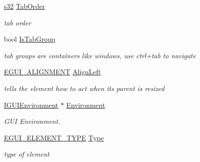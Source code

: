 \begin{DoxyCompactItemize}
\mbox{\label{classirr_1_1gui_1_1IGUIElement_a90fcd9d502bb0f6e8e5f2d091f54bafb}} 
\hyperlink{namespaceirr_ac66849b7a6ed16e30ebede579f9b47c6}{s32} \hyperlink{classirr_1_1gui_1_1IGUIElement_a90fcd9d502bb0f6e8e5f2d091f54bafb}{Tab\+Order}
\begin{DoxyCompactList}\small\item\em tab order \end{DoxyCompactList}\item 
\mbox{\label{classirr_1_1gui_1_1IGUIElement_a8ea1b4a60653c8cc157e806e14ae0558}} 
bool \hyperlink{classirr_1_1gui_1_1IGUIElement_a8ea1b4a60653c8cc157e806e14ae0558}{Is\+Tab\+Group}
\begin{DoxyCompactList}\small\item\em tab groups are containers like windows, use ctrl+tab to navigate \end{DoxyCompactList}\item 
\mbox{\label{classirr_1_1gui_1_1IGUIElement_a09873f314caf3144ebf470ccaa22762a}} 
\hyperlink{namespaceirr_1_1gui_a19eb5fb40e67f108cb16aba922ddaa2d}{E\+G\+U\+I\+\_\+\+A\+L\+I\+G\+N\+M\+E\+NT} \hyperlink{classirr_1_1gui_1_1IGUIElement_a09873f314caf3144ebf470ccaa22762a}{Align\+Left}
\begin{DoxyCompactList}\small\item\em tells the element how to act when its parent is resized \end{DoxyCompactList}\item 
\mbox{\label{classirr_1_1gui_1_1IGUIElement_ab3088fc970de70f2ea090e6535e3c1b0}} 
\hyperlink{classirr_1_1gui_1_1IGUIEnvironment}{I\+G\+U\+I\+Environment} $\ast$ \hyperlink{classirr_1_1gui_1_1IGUIElement_ab3088fc970de70f2ea090e6535e3c1b0}{Environment}
\begin{DoxyCompactList}\small\item\em G\+UI Environment. \end{DoxyCompactList}\item 
\mbox{\label{classirr_1_1gui_1_1IGUIElement_ad362880afa8ccb537b04032340e989e9}} 
\hyperlink{namespaceirr_1_1gui_ae4d66df0ecf4117cdbcf9f22404bd254}{E\+G\+U\+I\+\_\+\+E\+L\+E\+M\+E\+N\+T\+\_\+\+T\+Y\+PE} \hyperlink{classirr_1_1gui_1_1IGUIElement_ad362880afa8ccb537b04032340e989e9}{Type}
\begin{DoxyCompactList}\small\item\em type of element \end{DoxyCompactList}\end{DoxyCompactItemize}
